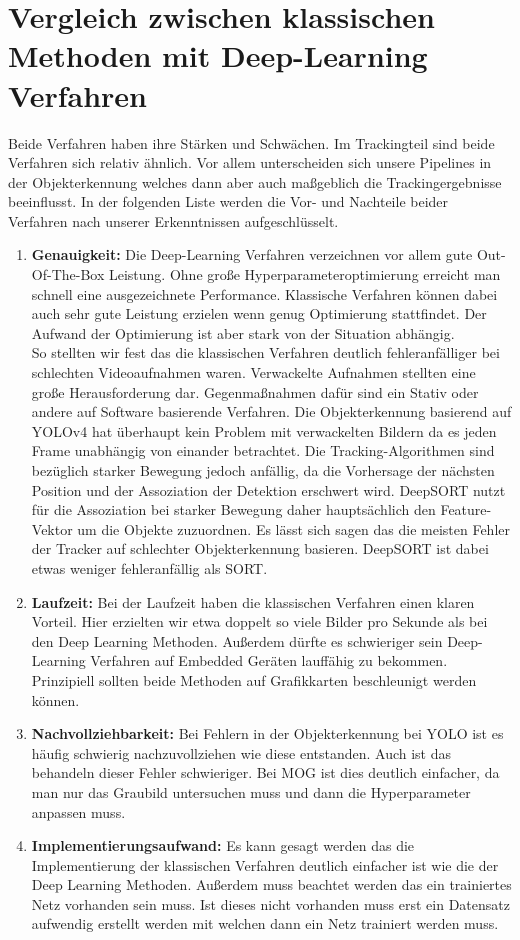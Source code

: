 \documentclass[conference]{IEEEtran}
\begin{document}
	\section{Vergleich zwischen klassischen Methoden mit Deep-Learning Verfahren}
	Beide Verfahren haben ihre Stärken und Schwächen. Im Trackingteil sind beide Verfahren sich relativ ähnlich. Vor allem unterscheiden sich unsere Pipelines in der Objekterkennung welches dann aber auch maßgeblich die Trackingergebnisse beeinflusst. In der folgenden Liste werden die Vor- und Nachteile beider Verfahren nach unserer Erkenntnissen aufgeschlüsselt.
	\begin{enumerate}
		\item \textbf{Genauigkeit:} Die Deep-Learning Verfahren verzeichnen vor allem gute Out-Of-The-Box Leistung. Ohne große Hyperparameteroptimierung erreicht man schnell eine ausgezeichnete Performance. Klassische Verfahren können dabei auch sehr gute Leistung erzielen wenn genug Optimierung stattfindet. Der Aufwand der Optimierung ist aber stark von der Situation abhängig.\\
		So stellten wir fest das die klassischen Verfahren deutlich fehleranfälliger bei schlechten Videoaufnahmen waren. Verwackelte Aufnahmen stellten eine große Herausforderung dar. Gegenmaßnahmen dafür sind ein Stativ oder andere auf Software basierende Verfahren. Die Objekterkennung basierend auf YOLOv4 hat überhaupt kein Problem mit verwackelten Bildern da es jeden Frame unabhängig von einander betrachtet. Die Tracking-Algorithmen sind bezüglich starker Bewegung jedoch anfällig, da die Vorhersage der nächsten Position und der Assoziation der Detektion erschwert wird. DeepSORT nutzt für die Assoziation bei starker Bewegung daher hauptsächlich den Feature-Vektor um die Objekte zuzuordnen. Es lässt sich sagen das die meisten Fehler der Tracker auf schlechter Objekterkennung basieren. DeepSORT ist dabei etwas weniger fehleranfällig als SORT.
		
		\item \textbf{Laufzeit:} Bei der Laufzeit haben die klassischen Verfahren einen klaren Vorteil. Hier erzielten wir etwa doppelt so viele Bilder pro Sekunde als bei den Deep Learning Methoden. Außerdem dürfte es schwieriger sein Deep-Learning Verfahren auf Embedded Geräten lauffähig zu bekommen. Prinzipiell sollten beide Methoden auf Grafikkarten beschleunigt werden können.
		
		\item \textbf{Nachvollziehbarkeit:} Bei Fehlern in der Objekterkennung bei YOLO ist es häufig schwierig nachzuvollziehen wie diese entstanden. Auch ist das behandeln dieser Fehler schwieriger. Bei MOG ist dies deutlich einfacher, da man nur das Graubild untersuchen muss und dann die Hyperparameter anpassen muss.
		
		\item \textbf{Implementierungsaufwand:} Es kann gesagt werden das die Implementierung der klassischen Verfahren deutlich einfacher ist wie die der Deep Learning Methoden. Außerdem muss beachtet werden das ein trainiertes Netz vorhanden sein muss. Ist dieses nicht vorhanden muss erst ein Datensatz aufwendig erstellt werden mit welchen dann ein Netz trainiert werden muss.
		
	\end{enumerate}
\end{document}
